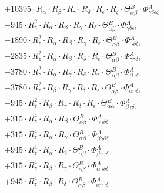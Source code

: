 \documentclass{article}
\begin{document}
\begin{subequations}
\begin{gather}
\begin{array}{c}
 		+ 10395 \cdot R_{\alpha{}} \cdot R_{\beta{}} \cdot R_{\gamma{}} \cdot R_{\delta{}} \cdot R_{\epsilon{}} \cdot R_{\zeta{}} \cdot \Theta{}^{B}_{\alpha{}\beta{}} \cdot \Phi{}^{A}_{\gamma{}\delta{}\epsilon{}\zeta{}} 
 \\[0.2em] 		 - 945 \cdot R_{z}^{2} \cdot R_{\alpha{}} \cdot R_{\beta{}} \cdot R_{\gamma{}} \cdot R_{\delta{}} \cdot \Theta{}^{B}_{\alpha{}\beta{}} \cdot \Phi{}^{A}_{\gamma{}\delta{}\epsilon{}\epsilon{}} 
 \\[0.2em] 		 - 1890 \cdot R_{z}^{2} \cdot R_{\alpha{}} \cdot R_{\beta{}} \cdot R_{\gamma{}} \cdot R_{\epsilon{}} \cdot \Theta{}^{B}_{\alpha{}\beta{}} \cdot \Phi{}^{A}_{\gamma{}\delta{}\delta{}\epsilon{}} 
 \\[0.2em] 		 - 2835 \cdot R_{z}^{2} \cdot R_{\alpha{}} \cdot R_{\beta{}} \cdot R_{\delta{}} \cdot R_{\epsilon{}} \cdot \Theta{}^{B}_{\alpha{}\beta{}} \cdot \Phi{}^{A}_{\gamma{}\gamma{}\delta{}\epsilon{}} 
 \\[0.2em] 		 - 3780 \cdot R_{z}^{2} \cdot R_{\alpha{}} \cdot R_{\gamma{}} \cdot R_{\delta{}} \cdot R_{\epsilon{}} \cdot \Theta{}^{B}_{\alpha{}\beta{}} \cdot \Phi{}^{A}_{\beta{}\gamma{}\delta{}\epsilon{}} 
 \\[0.2em] 		 - 3780 \cdot R_{z}^{2} \cdot R_{\beta{}} \cdot R_{\gamma{}} \cdot R_{\delta{}} \cdot R_{\epsilon{}} \cdot \Theta{}^{B}_{\alpha{}\beta{}} \cdot \Phi{}^{A}_{\alpha{}\gamma{}\delta{}\epsilon{}} 
 \\[0.2em] 		 - 945 \cdot R_{z}^{2} \cdot R_{\beta{}} \cdot R_{\gamma{}} \cdot R_{\delta{}} \cdot R_{\epsilon{}} \cdot \Theta{}^{B}_{\alpha{}\alpha{}} \cdot \Phi{}^{A}_{\beta{}\gamma{}\delta{}\epsilon{}} 
 \\[0.2em] 		 + 315 \cdot R_{z}^{4} \cdot R_{\alpha{}} \cdot R_{\beta{}} \cdot \Theta{}^{B}_{\alpha{}\beta{}} \cdot \Phi{}^{A}_{\gamma{}\gamma{}\delta{}\delta{}} 
 \\[0.2em] 		 + 315 \cdot R_{z}^{4} \cdot R_{\alpha{}} \cdot R_{\gamma{}} \cdot \Theta{}^{B}_{\alpha{}\beta{}} \cdot \Phi{}^{A}_{\beta{}\gamma{}\delta{}\delta{}} 
 \\[0.2em] 		 + 945 \cdot R_{z}^{4} \cdot R_{\alpha{}} \cdot R_{\delta{}} \cdot \Theta{}^{B}_{\alpha{}\beta{}} \cdot \Phi{}^{A}_{\beta{}\gamma{}\gamma{}\delta{}} 
 \\[0.2em] 		 + 315 \cdot R_{z}^{4} \cdot R_{\beta{}} \cdot R_{\gamma{}} \cdot \Theta{}^{B}_{\alpha{}\beta{}} \cdot \Phi{}^{A}_{\alpha{}\gamma{}\delta{}\delta{}} 
 \\[0.2em] 		 + 945 \cdot R_{z}^{4} \cdot R_{\beta{}} \cdot R_{\delta{}} \cdot \Theta{}^{B}_{\alpha{}\beta{}} \cdot \Phi{}^{A}_{\alpha{}\gamma{}\gamma{}\delta{}} 

\end{array}
\end{gather}
\end{subequations}
\end{document}
